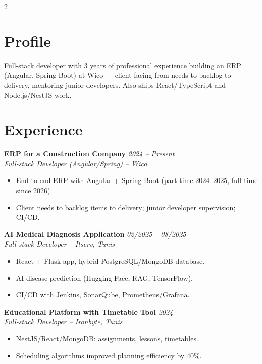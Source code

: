 \documentclass[10pt,a4paper]{article}
\begin{document}
\begin{paracol}{2}
\begin{leftcolumn}
\begin{minipage}{0.82\linewidth}
\end{minipage}
\end{leftcolumn}

\begin{rightcolumn}
\color{maindark}
\vspace{24pt}
\hspace{14pt}\begin{minipage}{0.9\linewidth}

\section*{Profile}
\small
Full-stack developer with 3 years of professional experience building an ERP
(Angular, Spring Boot) at Wico --- client-facing from needs to backlog to delivery,
mentoring junior developers. Also ships React/TypeScript and Node.js/NestJS work.

\section*{Experience}
\small

\textbf{ERP for a Construction Company} \hfill \textit{2024 -- Present}\\
\textit{Full-stack Developer (Angular/Spring) -- Wico}
\begin{itemize}[leftmargin=12pt,itemsep=1pt,topsep=2pt,parsep=0pt]
  \item End-to-end ERP with Angular + Spring Boot (part-time 2024--2025, full-time since 2026).
  \item Client needs to backlog items to delivery; junior developer supervision; CI/CD.
\end{itemize}

\vspace{4pt}
\textbf{AI Medical Diagnosis Application} \hfill \textit{02/2025 -- 08/2025}\\
\textit{Full-stack Developer -- Itserv, Tunis}
\begin{itemize}[leftmargin=12pt,itemsep=1pt,topsep=2pt,parsep=0pt]
  \item React + Flask app, hybrid PostgreSQL/MongoDB database.
  \item AI disease prediction (Hugging Face, RAG, TensorFlow).
  \item CI/CD with Jenkins, SonarQube, Prometheus/Grafana.
\end{itemize}

\vspace{4pt}
\textbf{Educational Platform with Timetable Tool} \hfill \textit{2024}\\
\textit{Full-stack Developer -- Ironbyte, Tunis}
\begin{itemize}[leftmargin=12pt,itemsep=1pt,topsep=2pt,parsep=0pt]
  \item NestJS/React/MongoDB: assignments, lessons, timetables.
  \item Scheduling algorithms improved planning efficiency by 40\%.
\end{itemize}


\end{minipage}
\end{rightcolumn}
\end{paracol}
\end{document}
